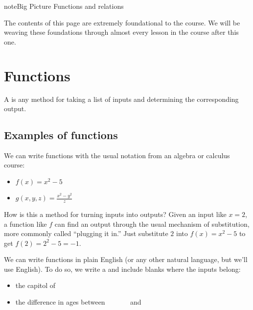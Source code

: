 \documentclass[letterpaper,10pt,english]{jupyterBook}
\begin{document}
\begin{sphinxadmonition}{note}{Big Picture \sphinxhyphen{} Functions and relations}

\sphinxAtStartPar
The contents of this page are extremely foundational to the course.  We will be weaving these foundations through almost every lesson in the course after this one.
\end{sphinxadmonition}


\section{Functions}
\label{\detokenize{chapter-2-mathematical-foundations:functions}}
\sphinxAtStartPar
{} A  is any method for taking a list of inputs and determining the corresponding output.


\subsection{Examples of functions}
\label{\detokenize{chapter-2-mathematical-foundations:examples-of-functions}}
\sphinxAtStartPar
{} We can write functions with the usual notation from an algebra or calculus course:
\begin{itemize}
\item {} 
\sphinxAtStartPar
\(f(x)=x^2-5\)

\item {} 
\sphinxAtStartPar
\(g(x,y,z)=\frac{x^2-y^2}{z}\)

\end{itemize}

\sphinxAtStartPar
How is this a method for turning inputs into outputs?  Given an input like \(x=2\), a function like \(f\) can find an output through the usual mechanism of substitution, more commonly called “plugging it in.”  Just substitute \(2\) into \(f(x)=x^2-5\) to get \(f(2)=2^2-5=-1\).

\sphinxAtStartPar
{} We can write functions in plain English (or any other natural language, but we’ll use English).  To do so, we write a  and include blanks where the inputs belong:
\begin{itemize}
\item {} 
\sphinxAtStartPar
the capitol of        

\item {} 
\sphinxAtStartPar
the difference in ages between         and        

\end{itemize}
\end{document}
